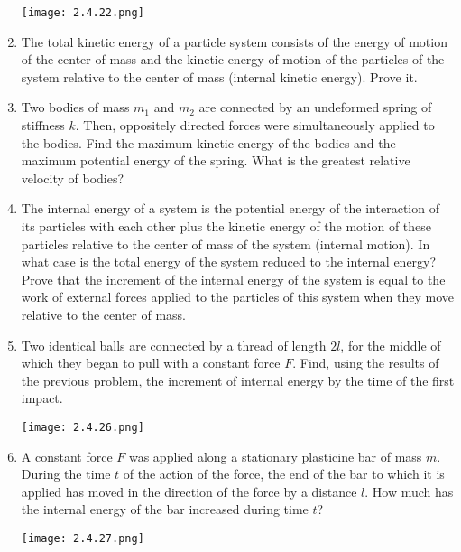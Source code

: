 \documentclass{article}
\begin{document}
\begin{enumerate}[label=2.4.\arabic*]
\begin{center}
    \texttt{[image: 2.4.22.png]}
\end{center}


\item The total kinetic energy of a particle system consists of the energy of motion of the center of mass and the kinetic energy of motion of the particles of the system relative to the center of mass (internal kinetic energy). Prove it.

\item Two bodies of mass $m_1$ and $m_2$ are connected by an undeformed spring of stiffness $k$. Then, oppositely directed forces were simultaneously applied to the bodies. Find the maximum kinetic energy of the bodies and the maximum potential energy of the spring. What is the greatest relative velocity of bodies?

\item The internal energy of a system is the potential energy of the interaction of its particles with each other plus the kinetic energy of the motion of these particles relative to the center of mass of the system (internal motion). In what case is the total energy of the system reduced to the internal energy? Prove that the increment of the internal energy of the system is equal to the work of external forces applied to the particles of this system when they move relative to the center of mass.

\item Two identical balls are connected by a thread of length $2l$, for the middle of which they began to pull with a constant force $F$. Find, using the results of the previous problem, the increment of internal energy by the time of the first impact.

\begin{center}
    \texttt{[image: 2.4.26.png]}
\end{center}


\item A constant force $F$ was applied along a stationary plasticine bar of mass $m$. During the time $t$ of the action of the force, the end of the bar to which it is applied has moved in the direction of the force by a distance $l$. How much has the internal energy of the bar increased during time $t$?

\begin{center}
    \texttt{[image: 2.4.27.png]}
\end{center}



\end{enumerate}
\end{document}
